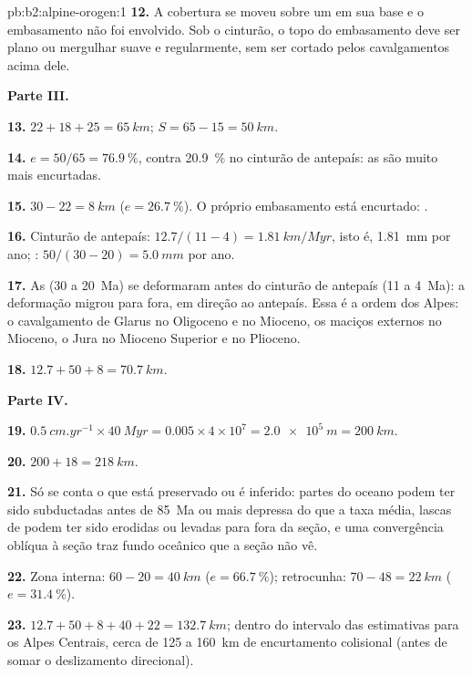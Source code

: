 \begin{solution}{pb:b2:alpine-orogen:1}
\textbf{12.} A cobertura se moveu sobre um  em sua base e o embasamento não foi
envolvido. Sob o cinturão, o topo do embasamento deve ser plano ou mergulhar suave e
regularmente, sem ser cortado pelos cavalgamentos acima dele.

\noindent\textbf{Parte III.}

\textbf{13.} $22 + 18 + 25 = \qty{65}{km}$; $S = 65 - 15 = \qty{50}{km}$.

\textbf{14.} $e = 50/65 = \qty{76.9}{\percent}$, contra \qty{20.9}{\percent} no
cinturão de antepaís: as  são muito mais encurtadas.

\textbf{15.} $30 - 22 = \qty{8}{km}$ ($e = \qty{26.7}{\percent}$). O próprio embasamento está
encurtado: .

\textbf{16.} Cinturão de antepaís: $12.7/(11 - 4) = \qty{1.81}{km/Myr}$, isto é,
\qty{1.81}{mm} por ano; : $50/(30 - 20) = \qty{5.0}{mm}$ por ano.

\textbf{17.} As  (30 a \qty{20}{Ma}) se deformaram antes do cinturão de antepaís (11 a
\qty{4}{Ma}): a deformação migrou para fora, em direção ao antepaís. Essa é a ordem dos
Alpes: o cavalgamento de Glarus no Oligoceno e no Mioceno, os maciços externos no Mioceno,
o Jura no Mioceno Superior e no Plioceno.

\textbf{18.} $12.7 + 50 + 8 = \qty{70.7}{km}$.

\noindent\textbf{Parte IV.}

\textbf{19.} $\qty{0.5}{cm.yr^{-1}}\times\qty{40}{Myr} = 0.005\times4\times10^7 =
\qty{2.0e5}{m} = \qty{200}{km}$.

\textbf{20.} $200 + 18 = \qty{218}{km}$.

\textbf{21.} Só se conta o que está preservado ou é inferido: partes do oceano podem ter
sido subductadas antes de \qty{85}{Ma} ou mais depressa do que a taxa média, lascas de  podem ter
sido erodidas ou levadas para fora da seção, e uma convergência oblíqua à seção traz
fundo oceânico que a seção não vê.

\textbf{22.} Zona interna: $60 - 20 = \qty{40}{km}$ ($e = \qty{66.7}{\percent}$); retrocunha:
$70 - 48 = \qty{22}{km}$ ($e = \qty{31.4}{\percent}$).

\textbf{23.} $12.7 + 50 + 8 + 40 + 22 = \qty{132.7}{km}$; dentro do intervalo das estimativas
para os Alpes Centrais, cerca de 125 a \qty{160}{km} de encurtamento colisional (antes de somar
o deslizamento direcional).


\end{solution}
